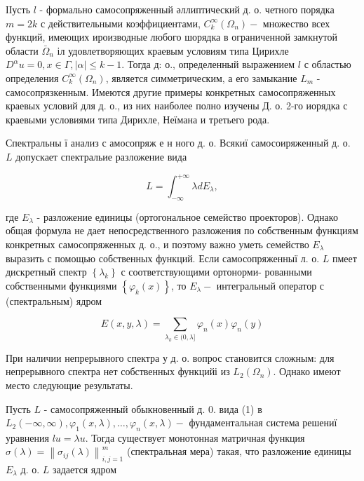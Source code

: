 \documentclass[10pt]{article}
\begin{document}
ІІусть $l$ - формально самосопряженный әллиптический д. о. четного порядка $m=2 k$ с действительными коэффициентами, $C_{k}^{\infty}\left(\Omega_{n}\right)-$ множество всех функций, имеющих ироизводные любого шорядка в ограниченной замкнутой области $\bar{\Omega}_{n}$ іл удовлетворяющих краевым условиям типа Цирихле $D^{\alpha} u=0, x \in \Gamma,|\alpha| \leqslant k-1$. Тогда д: о., определенный выражением $l$ с областью определения $C_{k}^{\infty}\left(\Omega_{n}\right)$, является симметрическим, а его замыкание $L_{m}$ - самосопрязкенным. Имеются другие примеры конкретных самосопряженных краевых условий для д. о., из них наиболее полно изучены Д. о. 2-го иорядка с краевыми условиями типа Дирихле, Неїмана и третьего рода.



Спектральны ї анализ с амосопряж е н ного д. о. Всякиї самосоиряженный д. о. $L$ допускает спектральие разложение вида



\[

L=\int_{-\infty}^{+\infty} \lambda d E_{\lambda},

\]



где $E_{\lambda}$ - разложение единицы (ортогональное семейство проекторов). Однако общая формула не дает непосредственного разложения по собственным функциям конкретных самосопряженных д. о., и поэтому важно уметь семейство $E_{\lambda}$ выразить с помощью собственных функций. Если самосопряженныї л. о. $L$ пмеет дискретный спектр $\left\{\lambda_{k}\right\}$ с соответствующими ортонорми- рованными собственными функциями $\left\{\varphi_{k}(x)\right\}$, то $E_{\lambda}-$ интегральный оператор с (спектральным) ядром



\[

E(x, y, \lambda)=\sum_{\lambda_{k} \in(0, \lambda]} \varphi_{n}(x) \varphi_{n}(y)

\]



При наличии непрерывного спектра у д. о. вопрос становится сложным: для непрерывного спектра нет собственных функцийі из $L_{2}\left(\Omega_{n}\right)$. Однако имеют место следующие результаты.



Пусть $L$ - самосопряженный обыкновенный д. 0. вида (1) в $L_{2}(-\infty, \infty), \varphi_{1}(x, \lambda), \ldots, \varphi_{n}(x, \lambda)-$ фундаментальная система решениї уравнения $l u=\lambda u$. Тогда существует монотонная матричная функция $\sigma(\lambda)=\left\|\sigma_{i j}(\lambda)\right\|_{i, j=1}^{m}$ (спектральная мера) такая, что разложение единицы $E_{\lambda}$ д. о. $L$ задается ядром
\end{document}
